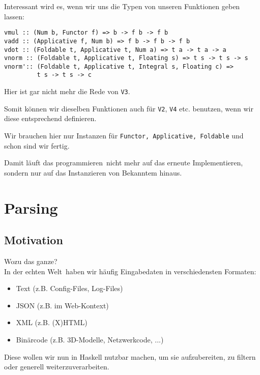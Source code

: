 \documentclass{beamer}
\begin{document}
\begin{frame}[fragile]
Interessant wird es, wenn wir uns die Typen von unseren Funktionen geben lassen:
\begin{verbatim}
vmul :: (Num b, Functor f) => b -> f b -> f b
vadd :: (Applicative f, Num b) => f b -> f b -> f b
vdot :: (Foldable t, Applicative t, Num a) => t a -> t a -> a
vnorm :: (Foldable t, Applicative t, Floating s) => t s -> t s -> s
vnorm':: (Foldable t, Applicative t, Integral s, Floating c) =>
         t s -> t s -> c
\end{verbatim}
\pause
Hier ist gar nicht mehr die Rede von \texttt{V3}.\\\par
\pause
Somit können wir dieselben Funktionen auch für \texttt{V2}, \texttt{V4} etc. benutzen, wenn wir diese entsprechend definieren.\\\par
\pause
Wir brauchen hier nur Instanzen für \texttt{Functor, Applicative, Foldable} und schon sind wir fertig.\\\par
\pause
Damit läuft das \glqq programmieren\grqq \ nicht mehr auf das erneute Implementieren, sondern nur auf das Instanzieren von Bekanntem hinaus.
\end{frame}


\section{Parsing}

\subsection{Motivation}

\begin{frame}[fragile]
\large Wozu das ganze?\\
\normalsize In der \glqq echten Welt\grqq \ haben wir häufig Eingabedaten in verschiedensten Formaten:
\begin{itemize}
 \item Text (z.B. Config-Files, Log-Files)
 \item JSON (z.B. im Web-Kontext)
 \item XML (z.B. (X)HTML)
 \item Binärcode (z.B. 3D-Modelle, Netzwerkcode, ...)
\end{itemize}
\pause
Diese wollen wir nun in Haskell nutzbar machen, um sie aufzubereiten, zu filtern oder generell weiterzuverarbeiten.
\end{frame}
\end{document}

